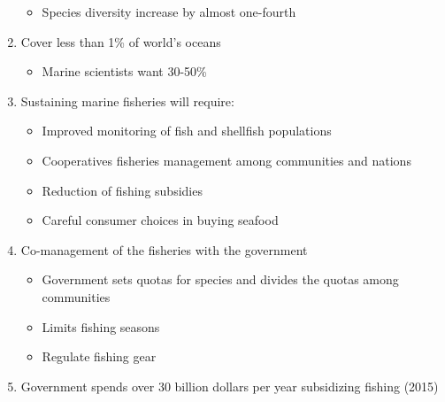 \documentclass[12pt]{article}
\begin{document}
\begin{enumerate}
\begin{itemize}
      \item Species diversity increase by almost one-fourth

    \end{itemize}

  \item Cover less than 1\% of world's oceans

    \begin{itemize}

      \item Marine scientists want 30-50\%
        
    \end{itemize}

  \item Sustaining marine fisheries will require:

    \begin{itemize}

      \item Improved monitoring of fish and shellfish populations

      \item Cooperatives fisheries management among communities and nations

      \item Reduction of fishing subsidies

      \item Careful consumer choices in buying seafood

    \end{itemize}

  \item Co-management of the fisheries with the government

    \begin{itemize}

      \item Government sets quotas for species and divides the quotas among communities

      \item Limits fishing seasons

      \item Regulate fishing gear

    \end{itemize}

  \item Government spends over 30 billion dollars per year subsidizing fishing (2015)

    \begin{itemize}


\end{itemize}
\end{enumerate}
\end{document}
